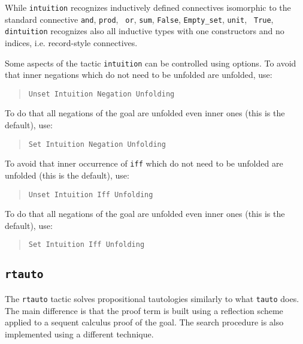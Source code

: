 \begin{coq_example*}
\begin{Variants}
  While {\tt intuition} recognizes inductively defined connectives
  isomorphic to the standard connective {\tt and}, {\tt prod}, {\tt
    or}, {\tt sum}, {\tt False}, {\tt Empty\_set}, {\tt unit}, {\tt
    True}, {\tt dintuition} recognizes also all inductive types with
  one constructors and no indices, i.e. record-style connectives.

\end{Variants}


Some aspects of the tactic {\tt intuition} can be
controlled using options. To avoid that inner negations which do not
need to be unfolded are unfolded, use:

\begin{quote}
{\tt Unset Intuition Negation Unfolding}
\end{quote}

To do that all negations of the goal are unfolded even inner ones
(this is the default), use:

\begin{quote}
{\tt Set Intuition Negation Unfolding}
\end{quote}

To avoid that inner occurrence of {\tt iff} which do not need to be
unfolded are unfolded (this is the default), use:

\begin{quote}
{\tt Unset Intuition Iff Unfolding}
\end{quote}

To do that all negations of the goal are unfolded even inner ones
(this is the default), use:

\begin{quote}
{\tt Set Intuition Iff Unfolding}
\end{quote}



\subsection{\tt rtauto}
\label{rtauto}

The {\tt rtauto} tactic solves propositional tautologies similarly to what {\tt tauto} does. The main difference is that the proof term is built using a reflection scheme applied to a sequent calculus proof of the goal. The search procedure is also implemented using a different technique.


\end{coq_example*}
